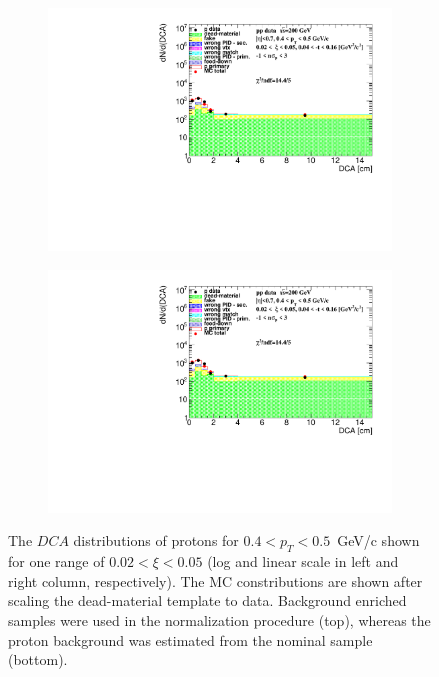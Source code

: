 \begin{figure}[htpb]
\begin{subfigure}{.47\textwidth}
	\end{subfigure}
	\begin{subfigure}{.47\textwidth}
		\includegraphics[width=\linewidth, page=3]{chapters/chrgSTAR/img/DCAproton/background_p_0.pdf}
	\end{subfigure}
	\begin{subfigure}{.47\textwidth}
		\includegraphics[width=\linewidth, page=4]{chapters/chrgSTAR/img/DCAproton/background_p_0.pdf}
	\end{subfigure}
	\caption[The $DCA$ distributions of protons for $0.4<p_T<0.5$~GeV/c shown for one range of $0.02<\xi<0.05$]{The $DCA$ distributions of protons for $0.4<p_T<0.5$~GeV/c shown for one range of $0.02<\xi<0.05$ (log and linear scale in left and right column, respectively). The MC  constributions are shown after scaling the dead-material template  to data. Background enriched samples were used in the normalization procedure (top), whereas the proton background was estimated from the nominal sample (bottom).}
	\label{fig:bkg_proton}
\end{figure}

